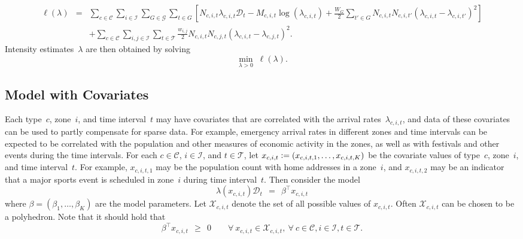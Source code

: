 \documentclass[article]{jss}
\def\defi{\vcentcolon=}
\begin{document}
\begin{equation}
\label{eqn:regularization1}
\begin{array}{lcl}
\ell(\lambda) & = &
\displaystyle \sum_{c \in \mathcal{C}} \sum_{i \in \mathcal{I}} \sum_{G \in \mathcal{G}} \sum_{t \in G} \left[N_{c,i,t} \lambda_{c,i,t} \mathcal{D}_{t} - M_{c,i,t} \log\left(\lambda_{c,i,t}\right) + \frac{W_{G}}{2} \sum_{t' \in G} N_{c,i,t} N_{c,i,t'} \left(\lambda_{c,i,t} - \lambda_{c,i,t'}\right)^2 \right] \\  
&& \displaystyle + \sum_{c \in \mathcal{C}} \sum_{i,j \in \mathcal{I}} \sum_{t \in \mathcal{T}} \frac{w_{i,j}}{2} N_{c,i,t} N_{c,j,t} \left(\lambda_{c,i,t} - \lambda_{c,j,t}\right)^2.
\end{array}
\end{equation}
Intensity estimates~$\lambda$ are then obtained by solving 
\begin{equation}
\label{eqn:model0}
\displaystyle \min_{\lambda > 0} \; \ell(\lambda).
\end{equation}


\subsection{Model with Covariates}
\label{sec:modelcov}

Each type~$c$, zone~$i$, and time interval~$t$ may have covariates that are correlated with the arrival rates~$\lambda_{c,i,t}$, and data of these covariates can be used to partly compensate for sparse data.
For example, emergency arrival rates in different zones and time intervals can be expected to be correlated with the population and other measures of economic activity in the zones, as well as with festivals and other events during the time intervals.
For each $c \in \mathcal{C}$, $i \in \mathcal{I}$, and $t \in \mathcal{T}$, let $x_{c,i,t} \defi (x_{c,i,t,1},\ldots,x_{c,i,t,K})$ be the covariate values of type~$c$, zone~$i$, and time interval~$t$. For example, $x_{c,i,t,1}$ may be the population count with home addresses in a zone~$i$, and $x_{c,i,t,2}$ may be an indicator that a major sports event is scheduled in zone~$i$ during time interval~$t$.
Then consider the model
\begin{equation}
\label{eqn:covariate model}
\lambda(x_{c,i,t}) \mathcal{D}_{t} \ \ = \ \ \beta^{\top} x_{c,i,t}
\end{equation}
where $\beta = (\beta_{1},\ldots,\beta_{K})$ are the model parameters.
Let $\mathcal{X}_{c,i,t}$ denote the set of all possible values of $x_{c,i,t}$.
Often $\mathcal{X}_{c,i,t}$ can be chosen to be a polyhedron.
Note that it should hold that
\begin{equation}
\beta^{\top} x_{c,i,t} \ \ \ge \ \ 0 \qquad \forall \ x_{c,i,t} \in \mathcal{X}_{c,i,t}, \ \forall \ c \in \mathcal{C}, i \in \mathcal{I}, t \in \mathcal{T}.
\label{eqn:feassetref1}
\end{equation}
\end{document}
